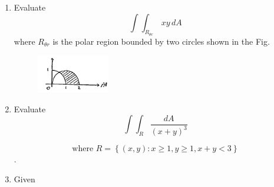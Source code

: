 \documentclass[11pt]{amsbook}
\begin{document}
\begin{enumerate}[{1.}]
	\item
	Evaluate
			$$
			\int  \int_{R_{\theta r } } \,xy   \,dA  
			$$
		where $ R_{ \theta r  } $
		is the polar region bounded 
		by  two circles shown in the Fig.
		
	    \begin{figure}[htb]
	        \centering
	        \includegraphics[width=0.3\textwidth]{images/b2p2_page405_figure_002}
        \end{figure}
	
	\item
	Evaluate
	$$
	\int  \int_{R}   \frac{dA}{ (x+y)^3 } 
	$$
	
	$$ \text{where } R =\left\lbrace 
	 \left( x,y \right) :  
	  x\geq1 ,
	  y\geq1,
	  x+y<3
	\right\rbrace  $$.
	
	\item
	Given
	
	\end{enumerate}	



\end{document}
